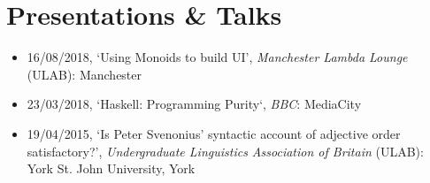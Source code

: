 \section{Presentations \& Talks}

\begin{itemize}
	\item 16/08/2018, `Using Monoids to build UI', \emph{Manchester Lambda Lounge} (ULAB): Manchester
	\item 23/03/2018, `Haskell: Programming Purity`, \emph{BBC}: MediaCity
	\item 19/04/2015, `Is Peter Svenonius' syntactic account of adjective order satisfactory?', \emph{Undergraduate Linguistics Association of Britain} (ULAB): York St. John University, York
\end{itemize}
